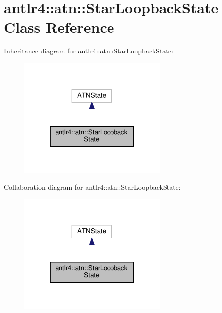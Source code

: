 \hypertarget{classantlr4_1_1atn_1_1StarLoopbackState}{}\section{antlr4\+:\+:atn\+:\+:Star\+Loopback\+State Class Reference}
\label{classantlr4_1_1atn_1_1StarLoopbackState}


Inheritance diagram for antlr4\+:\+:atn\+:\+:Star\+Loopback\+State\+:
\nopagebreak
\begin{figure}[H]
\begin{center}
\leavevmode
\includegraphics[width=206pt]{classantlr4_1_1atn_1_1StarLoopbackState__inherit__graph}
\end{center}
\end{figure}


Collaboration diagram for antlr4\+:\+:atn\+:\+:Star\+Loopback\+State\+:
\nopagebreak
\begin{figure}[H]
\begin{center}
\leavevmode
\includegraphics[width=206pt]{classantlr4_1_1atn_1_1StarLoopbackState__coll__graph}
\end{center}
\end{figure}
